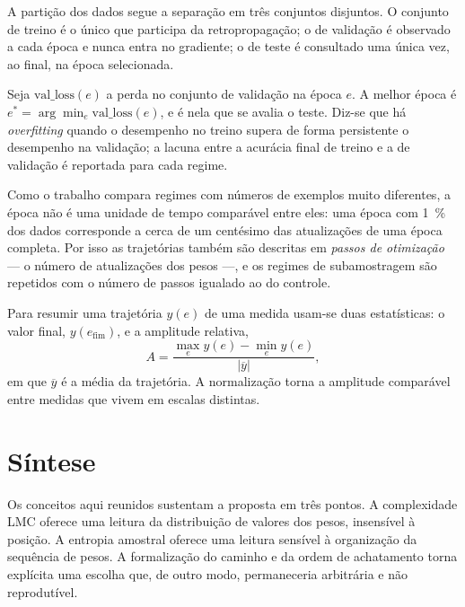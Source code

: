 A partição dos dados segue a separação em três conjuntos disjuntos. O conjunto
de treino é o único que participa da retropropagação; o de validação é
observado a cada época e nunca entra no gradiente; o de teste é consultado uma
única vez, ao final, na época selecionada.

Seja $\mathrm{val\_loss}(e)$ a perda no conjunto de validação na época $e$. A
melhor época é $e^{*} = \arg\min_{e} \mathrm{val\_loss}(e)$, e é nela que se
avalia o teste. Diz-se que há \emph{overfitting} quando o desempenho no treino
supera de forma persistente o desempenho na validação; a lacuna entre a
acurácia final de treino e a de validação é reportada para cada regime.

Como o trabalho compara regimes com números de exemplos muito diferentes, a
época não é uma unidade de tempo comparável entre eles: uma época com
\SI{1}{\percent} dos dados corresponde a cerca de um centésimo das atualizações
de uma época completa. Por isso as trajetórias também são descritas em
\emph{passos de otimização} --- o número de atualizações dos pesos ---, e os
regimes de subamostragem são repetidos com o número de passos igualado ao do
controle.

Para resumir uma trajetória $y(e)$ de uma medida usam-se duas estatísticas: o
valor final, $y(e_{\mathrm{fim}})$, e a amplitude relativa,
\begin{equation}
    A = \frac{\max_e y(e) - \min_e y(e)}{\left|\overline{y}\right|},
    \label{eq:amplitude}
\end{equation}
em que $\overline{y}$ é a média da trajetória. A normalização torna a
amplitude comparável entre medidas que vivem em escalas distintas.

\section{Síntese}
\label{sec:T-sintese}

Os conceitos aqui reunidos sustentam a proposta em três pontos. A complexidade
LMC oferece uma leitura da distribuição de valores dos pesos, insensível à
posição. A entropia amostral oferece uma leitura sensível à organização da
sequência de pesos. A formalização do caminho e da ordem de achatamento
torna explícita uma escolha que, de outro modo, permaneceria arbitrária e não
reprodutível.
